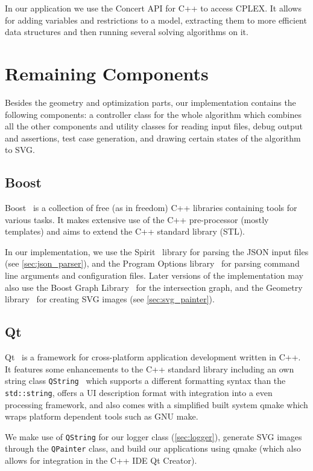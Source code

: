In our application we use the Concert API for C++ \cite{cplex_concert}
to access CPLEX. It allows for adding variables and restrictions to
a model, extracting them to more efficient data structures and then
running several solving algorithms on it.

\section{Remaining Components}
Besides the geometry and optimization parts, our implementation
contains the following components: a controller
class for the whole algorithm which combines all the other components
and utility classes for reading input files, debug
output and assertions, test case generation, and drawing certain 
states of the algorithm to SVG.

\subsection{Boost}
\label{sec:boost}
Boost~\cite{boost} is a collection of free (as in freedom) C++
libraries containing tools for various tasks. It makes extensive use
of the C++ pre-processor (mostly templates) and aims to extend the
C++ standard library (STL).

In our implementation, we use the Spirit~\cite{boost_spirit} library
for parsing the JSON input files (see \cref{sec:json_parser}), and
the Program Options library~\cite{boost_program_options} for parsing
command line arguments and configuration files. Later versions of the
implementation may also use the Boost Graph
Library~\cite{boost_graph} for the intersection graph, and the
Geometry library~\cite{boost_geometry} for creating SVG images
(see \cref{sec:svg_painter}).

\subsection{Qt}
\label{sec:Qt}
Qt~\cite{qt} is a framework for cross-platform application development
written in C++. It features some enhancements to the C++ standard
library including an own string class
\verb|QString|~\cite{qt_manual_qstring} which supports
a different formatting syntax than the \verb|std::string|, offers
a UI description format with integration into a even processing
framework, and also comes with a simplified built system qmake which
wraps platform dependent tools such as GNU make.

We make use of \verb|QString| for our logger class
(\cref{sec:logger}), generate SVG images through the \verb|QPainter|
class, and build our applications using qmake (which also allows
for integration in the C++ IDE Qt Creator).


